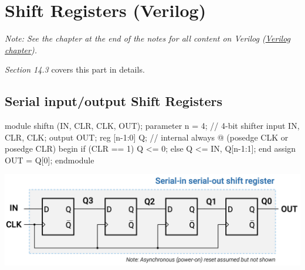 \documentclass[12pt,openany]{book}
\begin{document}
\section{Shift Registers (Verilog)}
 \textit{Note: See the chapter at the end of the notes for all content on Verilog (\hyperref[Verilog]{Verilog chapter}).}

\vspace*{-10px}
\textit{Section 14.3} covers this part in details.
\subsection{Serial input/output Shift Registers}
\begin{minipage}{0.4\textwidth}
	\begin{vhdl}
module shiftn (IN, CLR, CLK, OUT);
	parameter n = 4; // 4-bit shifter
	input IN, CLR, CLK;
	output OUT;
	reg [n-1:0] Q; // internal
	always @ (posedge CLK or posedge CLR)
		begin
			if (CLR == 1) Q <= 0;
			else Q <= {IN, Q[n-1:1]};
		end
	assign OUT = Q[0];
endmodule
	\end{vhdl}
\end{minipage}
\hfill
\hspace*{-4em}
\vline
\hfill
\hspace*{-8em}
\begin{minipage}{0.3\textwidth}
\includegraphics[width=1.3\textwidth]{circuits/14.1.2.png}
\end{minipage}
\end{document}
